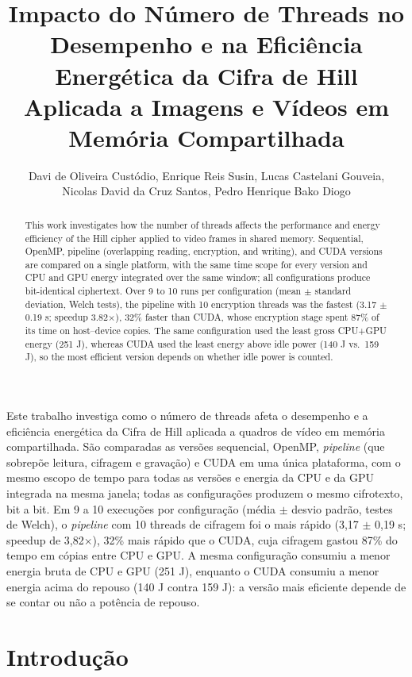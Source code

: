\documentclass[12pt]{article}
\title{Impacto do Número de Threads no Desempenho e na Eficiência Energética
da Cifra de Hill Aplicada a Imagens e Vídeos em Memória Compartilhada}
\author{Davi de Oliveira Custódio\inst{1}, Enrique Reis Susin\inst{1},
        Lucas Castelani Gouveia\inst{1}, \\
        Nicolas David da Cruz Santos\inst{1}, Pedro Henrique Bako Diogo\inst{1}}
\begin{document}
\maketitle



\begin{abstract}
This work investigates how the number of threads affects the performance and
energy efficiency of the Hill cipher applied to video frames in shared
memory. Sequential, OpenMP, pipeline (overlapping reading, encryption, and
writing), and CUDA versions are compared on a single platform, with the same
time scope for every version and CPU and GPU energy integrated over the same
window; all configurations produce bit-identical ciphertext. Over 9 to 10 runs
per configuration (mean $\pm$ standard deviation, Welch tests), the pipeline
with 10 encryption threads was the fastest (3.17 $\pm$ 0.19 s; speedup
3.82$\times$), 32\% faster than CUDA, whose encryption stage spent 87\% of its
time on host--device copies. The same configuration used the least gross
CPU+GPU energy (251 J), whereas CUDA used the least energy above idle power
(140 J vs.\ 159 J), so the most efficient version depends on whether idle
power is counted.
\end{abstract}

\begin{resumo}
Este trabalho investiga como o número de threads afeta o desempenho e a
eficiência energética da Cifra de Hill aplicada a quadros de vídeo em memória
compartilhada. São comparadas as versões sequencial, OpenMP,
\textit{pipeline} (que sobrepõe leitura, cifragem e gravação) e CUDA em uma
única plataforma, com o mesmo escopo de tempo para todas as versões e energia
da CPU e da GPU integrada na mesma janela; todas as configurações produzem o
mesmo cifrotexto, bit a bit. Em 9 a 10 execuções por configuração (média
$\pm$ desvio padrão, testes de Welch), o \textit{pipeline} com 10 threads de
cifragem foi o mais rápido (3,17 $\pm$ 0,19 s; speedup de 3,82$\times$), 32\%
mais rápido que o CUDA, cuja cifragem gastou 87\% do tempo em cópias entre CPU
e GPU. A mesma configuração consumiu a menor energia bruta de CPU e GPU
(251 J), enquanto o CUDA consumiu a menor energia acima do repouso (140 J
contra 159 J): a versão mais eficiente depende de se contar ou não a potência
de repouso.
\end{resumo}




\section{Introdução}
\end{document}
